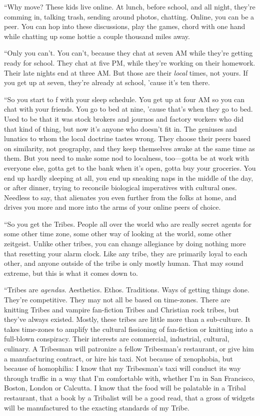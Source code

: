 “Why move? These kids live online. At lunch, before school, and all
night, they’re comming in, talking trash, sending around photos,
chatting. Online, you can be a peer. You can hop into these
discussions, play the games, chord with one hand while chatting up
some hottie a couple thousand miles away.

“Only you can’t. You can’t, because they chat at seven AM while
they’re getting ready for school. They chat at five PM, while
they’re working on their homework. Their late nights end at three
AM. But those are their \emph{local} times, not yours. If you get
up at seven, they’re already at school, ’cause it’s ten there.

“So you start to f with your sleep schedule. You get up at four AM
so you can chat with your friends. You go to bed at nine, ’cause
that’s when they go to bed. Used to be that it was stock brokers
and journos and factory workers who did that kind of thing, but now
it’s anyone who doesn’t fit in. The geniuses and lunatics to whom
the local doctrine tastes wrong. They choose their peers based on
similarity, not geography, and they keep themselves awake at the
same time as them. But you need to make some nod to localness,
too—gotta be at work with everyone else, gotta get to the bank when
it’s open, gotta buy your groceries. You end up hardly sleeping at
all, you end up sneaking naps in the middle of the day, or after
dinner, trying to reconcile biological imperatives with cultural
ones. Needless to say, that alienates you even further from the
folks at home, and drives you more and more into the arms of your
online peers of choice.

“So you get the Tribes. People all over the world who are really
secret agents for some other time zone, some other way of looking
at the world, some other zeitgeist. Unlike other tribes, you can
change allegiance by doing nothing more that resetting your alarm
clock. Like any tribe, they are primarily loyal to each other, and
anyone outside of the tribe is only mostly human. That may sound
extreme, but this is what it comes down to.

“Tribes are \emph{agendas}. Aesthetics. Ethos. Traditions. Ways of
getting things done. They’re competitive. They may not all be based
on time-zones. There are knitting Tribes and vampire fan-fiction
Tribes and Christian rock tribes, but they’ve always existed.
Mostly, these tribes are little more than a sub-culture. It takes
time-zones to amplify the cultural fissioning of fan-fiction or
knitting into a full-blown conspiracy. Their interests are
commercial, industrial, cultural, culinary. A Tribesman will
patronize a fellow Tribesman’s restaurant, or give him a
manufacturing contract, or hire his taxi. Not because of
xenophobia, but because of homophilia: I know that my Tribesman’s
taxi will conduct its way through traffic in a way that I’m
comfortable with, whether I’m in San Francisco, Boston, London or
Calcutta. I know that the food will be palatable in a Tribal
restaurant, that a book by a Tribalist will be a good read, that a
gross of widgets will be manufactured to the exacting standards of
my Tribe.

